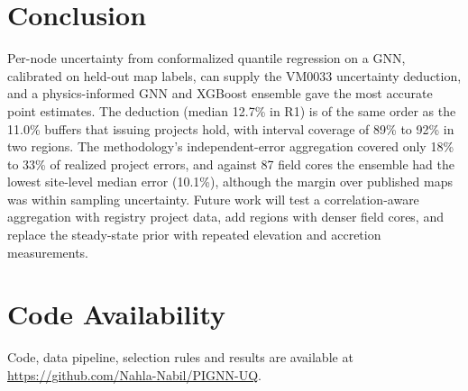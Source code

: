 \documentclass[conference]{IEEEtran}
\begin{document}
\section{Conclusion}
Per-node uncertainty from conformalized quantile regression on a GNN, calibrated on held-out map labels, can supply the VM0033 uncertainty deduction, and a physics-informed GNN and XGBoost ensemble gave the most accurate point estimates.
The deduction (median 12.7\% in R1) is of the same order as the 11.0\% buffers that issuing projects hold, with interval coverage of 89\% to 92\% in two regions.
The methodology's independent-error aggregation covered only 18\% to 33\% of realized project errors, and against 87 field cores the ensemble had the lowest site-level median error (10.1\%), although the margin over published maps was within sampling uncertainty.
Future work will test a correlation-aware aggregation with registry project data, add regions with denser field cores, and replace the steady-state prior with repeated elevation and accretion measurements.

\section*{Code Availability}
Code, data pipeline, selection rules and results are available at \url{https://github.com/Nahla-Nabil/PIGNN-UQ}.



\end{document}
